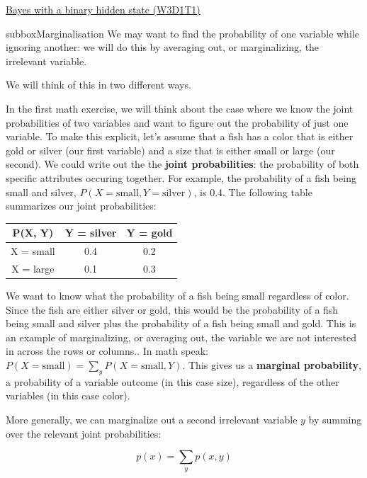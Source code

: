\begin{textbox}{\href{https://compneuro.neuromatch.io/tutorials/W3D1_BayesianDecisions/student/W3D1_Tutorial1.html}{Bayes with a binary hidden state (W3D1T1)} }
\begin{subbox}{subbox}{Marginalisation}
\scriptsize
We may want to find the probability of one variable while ignoring another: we will do this by averaging out, or marginalizing, the irrelevant variable.

We will think of this in two different ways.

In the first math exercise, we will think about the case where we know the joint probabilities of two variables and want to figure out the probability of just one variable. To make this explicit, let's assume that a fish has a color that is either gold or silver (our first variable) and a size that is either small or large (our second). We could write out the the \textbf{joint probabilities}: the probability of both specific attributes occuring together. For example, the probability of a fish being small and silver, $P(X = \textrm{small}, Y = \textrm{silver})$, is 0.4. The following table summarizes our joint probabilities:

\begin{center}
\begin{tabular}{||c c c||} 
 \hline
 P(X, Y) & Y = silver & Y = gold \\ [0.5ex] 
 \hline\hline
 X = small & 0.4 & 0.2\\ 
 \hline
 X = large & 0.1  & 0.3  \\ [1ex] 
 \hline
\end{tabular}
\end{center}
We want to know what the probability of a fish being small  regardless of color. Since the fish are either silver or gold, this would be the probability of a fish being small and silver plus the probability of a fish being small and gold. This is an example of marginalizing, or averaging out, the variable we are not interested in across the rows or columns.. In math speak: $P(X = \textrm{small}) = \sum_y{P(X = \textrm{small}, Y)}$. This gives us a \textbf{marginal probability}, a probability of a variable outcome (in this case size), regardless of the other variables (in this case color).

More generally, we can marginalize out a second irrelevant variable $y$ by summing over the relevant joint probabilities:

$$p(x) = \sum_y p(x, y) $$


\end{subbox}
\end{textbox}
